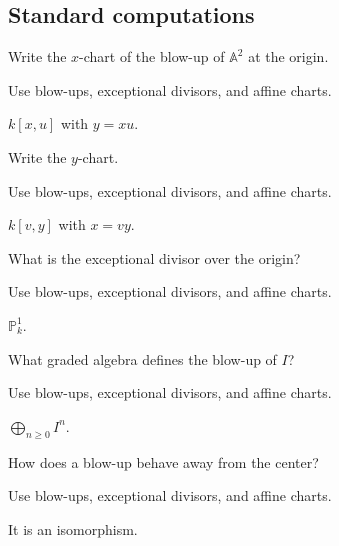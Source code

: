 \subsection*{Standard computations}

\begin{exercise}\label{exr:vi45-expand-01}
Write the $x$-chart of the blow-up of $\mathbb A^2$ at the origin.
\end{exercise}
\begin{hint}
Use blow-ups, exceptional divisors, and affine charts.
\end{hint}
\begin{solution}
$k[x,u]$ with $y=xu$.
\end{solution}

\begin{exercise}\label{exr:vi45-expand-02}
Write the $y$-chart.
\end{exercise}
\begin{hint}
Use blow-ups, exceptional divisors, and affine charts.
\end{hint}
\begin{solution}
$k[v,y]$ with $x=vy$.
\end{solution}

\begin{exercise}\label{exr:vi45-expand-03}
What is the exceptional divisor over the origin?
\end{exercise}
\begin{hint}
Use blow-ups, exceptional divisors, and affine charts.
\end{hint}
\begin{solution}
$\mathbb P^1_k$.
\end{solution}

\begin{exercise}\label{exr:vi45-expand-04}
What graded algebra defines the blow-up of $I$?
\end{exercise}
\begin{hint}
Use blow-ups, exceptional divisors, and affine charts.
\end{hint}
\begin{solution}
$\bigoplus_{n\ge0}I^n$.
\end{solution}

\begin{exercise}\label{exr:vi45-expand-05}
How does a blow-up behave away from the center?
\end{exercise}
\begin{hint}
Use blow-ups, exceptional divisors, and affine charts.
\end{hint}
\begin{solution}
It is an isomorphism.
\end{solution}

